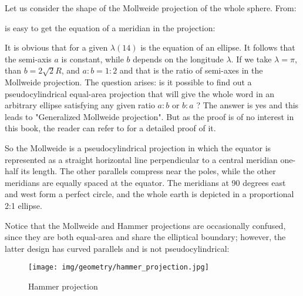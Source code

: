	Let us consider the shape of the Mollweide projection of the whole sphere. From:
	
	is easy to get the equation of a meridian in the projection:
	
	It is obvious that for a given $\lambda(14)$ is the equation of an ellipse. It follows that the semi-axis $a$ is constant, while $b$ depends on the longitude $\lambda$. If we take $\lambda=\pi$, than $b=2 \sqrt{2} R$, and $a: b=1: 2$ and that is the ratio of semi-axes in the Mollweide projection. The question arises: is it possible to find out a pseudocylindrical equal-area projection that will give the whole word in an arbitrary ellipse satisfying any given ratio $a: b$ or $b: a$ ? The answer is yes and this leads to "Generalized Mollweide projection". But as the proof is of no interest in this book, the reader can refer to \cite{lapaine2011mollweideova} for a detailed proof of it.

	So the Mollweide is a pseudocylindrical projection in which the equator is represented as a straight horizontal line perpendicular to a central meridian one-half its length. The other parallels compress near the poles, while the other meridians are equally spaced at the equator. The meridians at 90 degrees east and west form a perfect circle, and the whole earth is depicted in a proportional 2:1 ellipse.
	
	Notice that the Mollweide and Hammer projections are occasionally confused, since they are both equal-area and share the elliptical boundary; however, the latter design has curved parallels and is not pseudocylindrical:
	\begin{figure}[H]
		\centering
		\texttt{[image: img/geometry/hammer\_projection.jpg]}
		\caption{Hammer projection}
	\end{figure}
	
